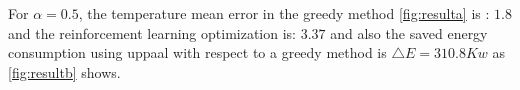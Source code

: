      For $\alpha = 0.5$, the temperature mean error in the greedy method 
      \autoref{fig:resulta} is : $1.8$ and the reinforcement learning optimization 
      is:  $3.37$ and also the saved energy consumption using uppaal with respect to 
      a greedy method is $ \bigtriangleup E = 310.8Kw$ as \autoref{fig:resultb} shows. %
        
